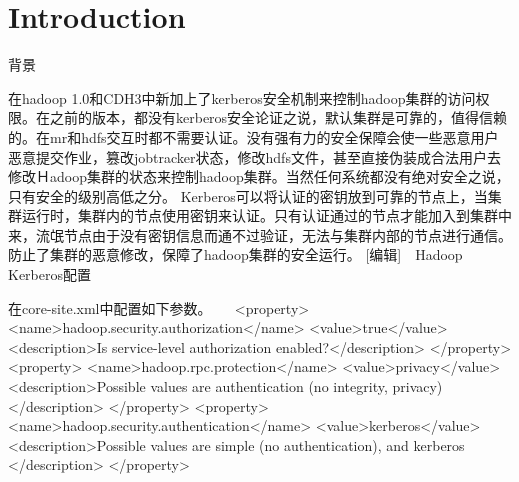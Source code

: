 \documentclass[a4paper,12pt]{article}
\begin{document}
\section{Introduction}
背景　

在hadoop 1.0和CDH3中新加上了kerberos安全机制来控制hadoop集群的访问权限。在之前的版本，都没有kerberos安全论证之说，默认集群是可靠的，值得信赖的。在mr和hdfs交互时都不需要认证。没有强有力的安全保障会使一些恶意用户恶意提交作业，篡改jobtracker状态，修改hdfs文件，甚至直接伪装成合法用户去修改Ｈadoop集群的状态来控制hadoop集群。当然任何系统都没有绝对安全之说，只有安全的级别高低之分。
Kerberos可以将认证的密钥放到可靠的节点上，当集群运行时，集群内的节点使用密钥来认证。只有认证通过的节点才能加入到集群中来，流氓节点由于没有密钥信息而通不过验证，无法与集群内部的节点进行通信。防止了集群的恶意修改，保障了hadoop集群的安全运行。
[编辑]　Hadoop Kerberos配置　

在core-site.xml中配置如下参数。 　
       <property>
         <name>hadoop.security.authorization</name>
         <value>true</value>
         <description>Is service-level authorization enabled?</description>
       </property>
       <property>
         <name>hadoop.rpc.protection</name>
         <value>privacy</value>
         <description>Possible values are authentication (no integrity, privacy)
         </description>
       </property>
       <property>
         <name>hadoop.security.authentication</name>
         <value>kerberos</value>
         <description>Possible values are simple (no authentication), and kerberos
         </description>
       </property>
\end{document}
